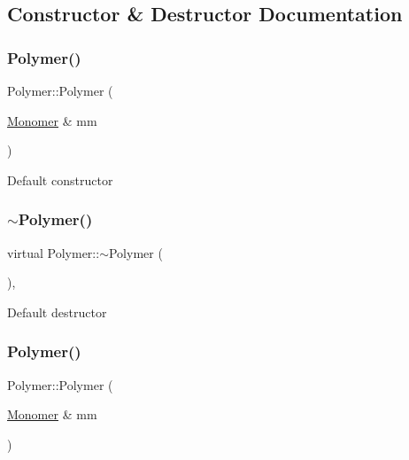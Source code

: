 \subsection{Constructor \& Destructor Documentation}
\mbox{\label{classPolymer_ae77454a3908652e4df6a26b9cac509a5}} 
\subsubsection{\texorpdfstring{Polymer()}{Polymer()}\hspace{0.1cm}{\footnotesize\ttfamily [1/14]}}
{\footnotesize\ttfamily Polymer\+::\+Polymer (\begin{DoxyParamCaption}\item[{\mbox{\hyperlink{classMonomer}{Monomer}} \&}]{mm }\end{DoxyParamCaption})\hspace{0.3cm}{\ttfamily [inline]}}

Default constructor \mbox{\label{classPolymer_aac2b3983f375a5691c7d5ca1a79594d5}} 
\subsubsection{\texorpdfstring{$\sim$\+Polymer()}{~Polymer()}\hspace{0.1cm}{\footnotesize\ttfamily [1/11]}}
{\footnotesize\ttfamily virtual Polymer\+::$\sim$\+Polymer (\begin{DoxyParamCaption}{ }\end{DoxyParamCaption})\hspace{0.3cm}{\ttfamily [inline]}, {\ttfamily [virtual]}}

Default destructor \mbox{\label{classPolymer_ae77454a3908652e4df6a26b9cac509a5}} 
\subsubsection{\texorpdfstring{Polymer()}{Polymer()}\hspace{0.1cm}{\footnotesize\ttfamily [2/14]}}
{\footnotesize\ttfamily Polymer\+::\+Polymer (\begin{DoxyParamCaption}\item[{\mbox{\hyperlink{classMonomer}{Monomer}} \&}]{mm }\end{DoxyParamCaption})\hspace{0.3cm}{\ttfamily [inline]}}

